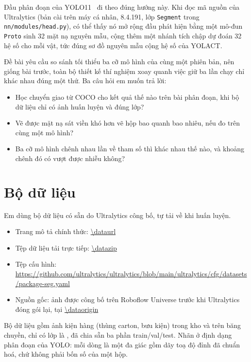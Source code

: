 \documentclass[11pt,a4paper]{article}
\begin{document}
Đầu phân đoạn của YOLO11~\cite{khanam2024} đi theo đúng hướng này. Khi đọc mã nguồn của Ultralytics
(bản cài trên máy cá nhân, 8.4.191, lớp \texttt{Segment} trong \texttt{nn/modules/head.py}), có thể thấy nó mở rộng
đầu phát hiện bằng một mô-đun \texttt{Proto} sinh 32 mặt nạ nguyên mẫu, cộng thêm một nhánh tích
chập dự đoán 32 hệ số cho mỗi vật, tức đúng sơ đồ nguyên mẫu cộng hệ số của YOLACT.

Đề bài yêu cầu so sánh tối thiểu ba cỡ mô hình của cùng một phiên bản, nên giống bài trước, toàn bộ
thiết kế thí nghiệm xoay quanh việc giữ ba lần chạy chỉ khác nhau đúng một thứ. Ba câu hỏi em muốn
trả lời:

\begin{itemize}
  \item Học chuyển giao từ COCO cho kết quả thế nào trên bài phân đoạn, khi bộ dữ liệu chỉ có
        \ntrain{} ảnh huấn luyện và đúng \nclasses{} lớp?
  \item Vẽ được mặt nạ sát viền khó hơn vẽ hộp bao quanh bao nhiêu, nếu đo trên cùng một mô hình?
  \item Ba cỡ mô hình chênh nhau \paramratio{} lần về tham số thì khác nhau thế nào, và khoảng
        chênh đó có vượt được nhiễu không?
\end{itemize}

\section{Bộ dữ liệu}

Em dùng bộ dữ liệu có sẵn \textbf{\dataname{}} do Ultralytics công bố, tự tải về khi huấn luyện.

\begin{itemize}
  \item Trang mô tả chính thức: \url{\dataurl}
  \item Tệp dữ liệu tải trực tiếp: \url{\datazip}
  \item Tệp cấu hình: \url{https://github.com/ultralytics/ultralytics/blob/main/ultralytics/cfg/datasets/package-seg.yaml}
  \item Nguồn gốc: ảnh được công bố trên Roboflow Universe trước khi Ultralytics đóng gói lại,
        tại \url{\dataorigin}
\end{itemize}

Bộ dữ liệu gồm ảnh kiện hàng (thùng carton, bưu kiện) trong kho và trên băng chuyền, chỉ có
\nclasses{} lớp là \classlist{}, đã chia sẵn ba phần train/val/test. Nhãn ở định dạng phân đoạn của
YOLO: mỗi dòng là một đa giác gồm dãy toạ độ đỉnh đã chuẩn hoá, chứ không phải bốn số của một hộp.
\end{document}
